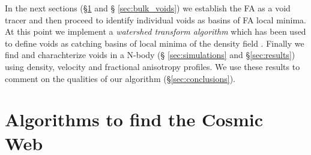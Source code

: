 \documentclass[a4,useAMS,usenatbib,usegraphicx]{mn2e}
\begin{document}

In the next sections (\S \ref{sec:algorithms_cosmic_web} and \S
\ref{sec:bulk_voids}) we establish the FA as a void tracer and then
proceed to identify individual voids as basins of FA local minima.  At
this point we implement a \textit{watershed transform algorithm}
\citep{Beucher79,Beucher93} which has been used to define voids as
catching basins of local minima of the density field \citep{Platen07,Neyrinck08}.
Finally we find and charachterize voids in a N-body (\S
\ref{sec:simulations} and \S \ref{sec:results}) using density, velocity and
fractional anisotropy profiles.  We use these results to comment on
the qualities of our algorithm (\S \ref{sec:conclusions}).  



\section{Algorithms to find the Cosmic Web}
\label{sec:algorithms_cosmic_web}
\end{document}
